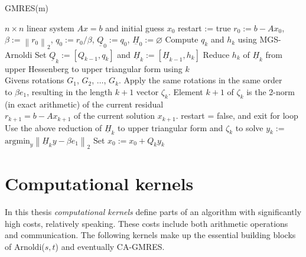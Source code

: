 \documentclass{scrartcl}
\numberwithin{equation}{section}
\newcommand{\norm}[1]{\left\lVert#1\right\rVert}
\begin{document}
\begin{algorithm}
\caption{GMRES(m)}
\label{alg:gmres(m)}
\begin{algorithmic}[1]
    \REQUIRE $n \times n$ linear system $Ax = b$ and initial guess $x_0$
    \STATE restart := true
    	\STATE $r_0:=b - Ax_0$, $\beta := \norm{r_0}_2$, $q_0 := r_0/\beta$, $\underline{Q}_0 := q_0$, $\underline{H}_0 := \varnothing$
			\STATE Compute $q_k$ and $h_k$ using MGS-Arnoldi
			\STATE Set $\underline{Q}_k := [Q_{k-1},q_k]$ and $\underline{H}_k := [\underline{H}_{k -1}, h_k]$
			\STATE Reduce ${h_k}$ of $\underline{H}_k$ from upper Hessenberg to upper triangular form using $k$ \\
		\hspace{\algorithmicindent} Givens rotations $G_1$, $G_2$, $ \ldots$, $G_{k}$. Apply the same rotations in the same order \\ 
		\hspace{\algorithmicindent} to $\beta e_1$,  resulting in the length $k + 1$ vector $\zeta_{k}$.
			\STATE Element $k + 1$ of $\zeta_k$ is the 2-norm (in exact arithmetic) of the current residual \\
\hspace{\algorithmicindent} $r_{k + 1} = b - Ax_{k + 1}$ of the current solution $x_{k + 1}$.
			\STATE restart = false, and exit for loop		
		\ENDIF
		\ENDFOR
		\STATE Use the above reduction of $\underline{H}_k$ to upper triangular form and $\zeta_k$ to solve $y_k :=$ \\ \hspace{\algorithmicindent} $\text{argmin}_{y} \norm{\underline{H}_k y - \beta e_1}_2$
		\STATE Set $x_0 := x_0 + Q_k y_k$
	\ENDWHILE 
\end{algorithmic}
\end{algorithm}



\section{Computational kernels}
In this thesis \textit{computational kernels} define parts of an algorithm with significantly high costs, relatively speaking. These costs include both arithmetic operations and communication. The following kernels make up the essential building blocks of Arnoldi($s,t$) and eventually CA-GMRES.
\end{document}
